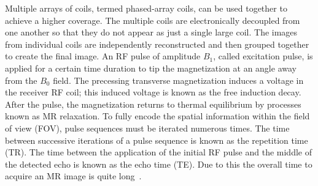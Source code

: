 Multiple arrays of coils, termed phased-array coils, can be used together to achieve a higher coverage. The multiple coils are electronically decoupled from one another so that they do not appear as just a single large coil. The images from individual coils are independently reconstructed and then grouped together to create the final image. An RF pulse of amplitude $B_1$, called excitation pulse, is applied for a certain time duration to tip the magnetization at an angle away from the $B_0$ field. The precessing transverse magnetization induces a voltage in the receiver RF coil; this induced voltage is known as the free induction decay. After the pulse, the magnetization returns to thermal equilibrium by processes known as MR relaxation. To fully encode the spatial information within the field of view (FOV), pulse sequences must be iterated numerous times. The time between successive iterations of a pulse sequence is known as the repetition time (TR). The time between the application of the initial RF pulse and the middle of the detected echo is known as the echo time (TE). Due to this the overall time to acquire an MR image is quite long~\cite{Serai2021}.\\

